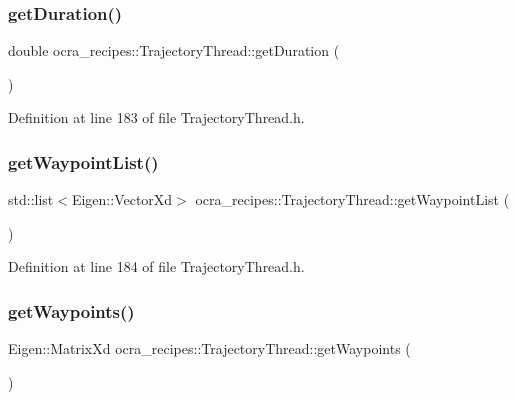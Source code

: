 \subsubsection{\texorpdfstring{get\+Duration()}{getDuration()}}
{\footnotesize\ttfamily double ocra\+\_\+recipes\+::\+Trajectory\+Thread\+::get\+Duration (\begin{DoxyParamCaption}{ }\end{DoxyParamCaption})\hspace{0.3cm}{\ttfamily [inline]}}



Definition at line 183 of file Trajectory\+Thread.\+h.

\hypertarget{classocra__recipes_1_1TrajectoryThread_a78ac745efb132b69d7129f1e9212ad87}{}\label{classocra__recipes_1_1TrajectoryThread_a78ac745efb132b69d7129f1e9212ad87} 
\subsubsection{\texorpdfstring{get\+Waypoint\+List()}{getWaypointList()}}
{\footnotesize\ttfamily std\+::list$<$Eigen\+::\+Vector\+Xd$>$ ocra\+\_\+recipes\+::\+Trajectory\+Thread\+::get\+Waypoint\+List (\begin{DoxyParamCaption}{ }\end{DoxyParamCaption})\hspace{0.3cm}{\ttfamily [inline]}}



Definition at line 184 of file Trajectory\+Thread.\+h.

\hypertarget{classocra__recipes_1_1TrajectoryThread_ae6830df6ce18f3a6f5656fe345b05731}{}\label{classocra__recipes_1_1TrajectoryThread_ae6830df6ce18f3a6f5656fe345b05731} 
\subsubsection{\texorpdfstring{get\+Waypoints()}{getWaypoints()}}
{\footnotesize\ttfamily Eigen\+::\+Matrix\+Xd ocra\+\_\+recipes\+::\+Trajectory\+Thread\+::get\+Waypoints (\begin{DoxyParamCaption}{ }\end{DoxyParamCaption})\hspace{0.3cm}{\ttfamily [inline]}}



